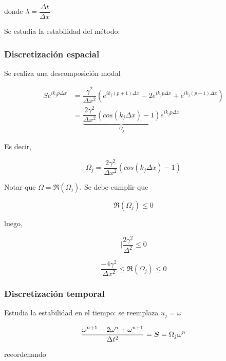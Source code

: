 donde $\lambda=\dfrac{\Delta t}{\Delta x}$

Se estudia la estabilidad del método: 

\subsubsection*{Discretización espacial}

Se realiza una descomposición modal

\begin{align*}
S e ^ { i k_j p \Delta x } &= \dfrac{\gamma^2}{\Delta x^2} \left( e ^ { i k_j (p+1) \Delta x } - 2 e ^ { i k_j p \Delta x } + e ^ { i k_j (p-1) \Delta x } \right) \\
&= \underbrace{\dfrac{2 \gamma^2}{\Delta x^2} \left( cos(k_j \Delta x) - 1 \right)}_{\Omega_j} e ^ { i k_j p \Delta x}
\end{align*}

Es decir,

\begin{equation} \label{OMEGA_LF}
\Omega_j = \dfrac{2 \gamma^2}{\Delta x^2} \left( cos(k_j \Delta x) - 1 \right)
\end{equation}

Notar que $\Omega = \Re(\Omega_j)$. Se debe cumplir que

\begin{equation}
\Re(\Omega_j) \leq 0
\end{equation}

luego,

\begin{equation}
\Big| \dfrac{2 \gamma^2 }{ \Delta^2 } \leq 0
\end{equation}

\begin{equation}
\dfrac{-4 \gamma^2}{\Delta x^2} \leq \Re(\Omega_j) \leq 0
\end{equation}

\subsubsection*{Discretización temporal}

Estudia la estabilidad en el tiempo: se reemplaza $u_{j} = \omega$

\begin{equation}
\dfrac{\omega^{n+1} -2\omega^{n} + \omega^{n+1}}{\Delta t^2} = \boldsymbol{S} = \Omega_j \omega^n
\end{equation}

reeordenando

